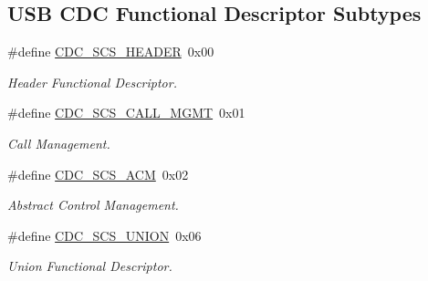 \subsection*{U\-S\-B C\-D\-C Functional Descriptor Subtypes}
\begin{DoxyCompactItemize}
\item 
\hypertarget{group__cdc__protocol__group_gafb7ba01e68938e255cfb6727c5a02f23}{\#define \hyperlink{group__cdc__protocol__group_gafb7ba01e68938e255cfb6727c5a02f23}{C\-D\-C\-\_\-\-S\-C\-S\-\_\-\-H\-E\-A\-D\-E\-R}~0x00}\label{group__cdc__protocol__group_gafb7ba01e68938e255cfb6727c5a02f23}

\begin{DoxyCompactList}\small\item\em Header Functional Descriptor. \end{DoxyCompactList}\item 
\hypertarget{group__cdc__protocol__group_gaeda25d7337f810f2bd205b579510ebd4}{\#define \hyperlink{group__cdc__protocol__group_gaeda25d7337f810f2bd205b579510ebd4}{C\-D\-C\-\_\-\-S\-C\-S\-\_\-\-C\-A\-L\-L\-\_\-\-M\-G\-M\-T}~0x01}\label{group__cdc__protocol__group_gaeda25d7337f810f2bd205b579510ebd4}

\begin{DoxyCompactList}\small\item\em Call Management. \end{DoxyCompactList}\item 
\hypertarget{group__cdc__protocol__group_gac06eb7a8f7ac43f6be353cc8cc5f8ce8}{\#define \hyperlink{group__cdc__protocol__group_gac06eb7a8f7ac43f6be353cc8cc5f8ce8}{C\-D\-C\-\_\-\-S\-C\-S\-\_\-\-A\-C\-M}~0x02}\label{group__cdc__protocol__group_gac06eb7a8f7ac43f6be353cc8cc5f8ce8}

\begin{DoxyCompactList}\small\item\em Abstract Control Management. \end{DoxyCompactList}\item 
\hypertarget{group__cdc__protocol__group_ga27581d98e9052d843b2f4767f7d39110}{\#define \hyperlink{group__cdc__protocol__group_ga27581d98e9052d843b2f4767f7d39110}{C\-D\-C\-\_\-\-S\-C\-S\-\_\-\-U\-N\-I\-O\-N}~0x06}\label{group__cdc__protocol__group_ga27581d98e9052d843b2f4767f7d39110}

\begin{DoxyCompactList}\small\item\em Union Functional Descriptor. \end{DoxyCompactList}\end{DoxyCompactItemize}
